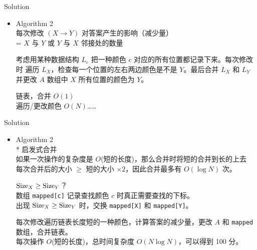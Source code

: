 \documentclass[UTF8]{beamer}
\begin{document}
\begin{frame}{Solution}

\begin{itemize}
    \item Algorithm 2 \\
        每次修改 $(X \rightarrow Y)$ 对答案产生的影响（减少量） \\
        = $X$ 与 $Y$ 或 $Y$ 与 $X$ 邻接处的数量

        \pause
        考虑用某种数据结构 $L_c$ 把一种颜色 $c$ 对应的所有位置都记录下来。每次修改时
        遍历 $L_X$，检查每一个位置的左右两边颜色是不是 $Y$。最后合并 $L_X$ 和 $L_Y$
        并更改 $A$ 数组中 $X$ 所有位置的颜色为 $Y$。

        \pause 链表，合并 $O(1)$ \\
        \pause 遍历/更改颜色 $O(N)$……
        
\end{itemize}

\end{frame}

\begin{frame}{Solution}

\begin{itemize}
    \item Algorithm 2 \\
        * 启发式合并 \\
        如果一次操作的复杂度是 $O$(短的长度)，那么合并时将短的合并到长的上去 \\
        每次合并后的大小 $\geq$ 短的大小 $\times 2$，因此合并最多有 $O(\log N)$ 次。

        \pause
        ${\rm Size}_X \ge {\rm Size}_Y$？ \\
        数组 \texttt{mapped[c]} 记录查找颜色 $c$ 时真正需要查找的下标。 \\
        出现 ${\rm Size}_X \ge {\rm Size}_Y$ 时，交换 \texttt{mapped[X]} 和 \texttt{mapped[Y]}。

        \pause
        每次修改遍历链表长度短的一种颜色，计算答案的减少量，更改 $A$ 和 \texttt{mapped} 数组，合并链表。 \\
        每次操作 $O$(短的长度)，总时间复杂度 $O(N \log N)$，可以得到 100 分。
\end{itemize}

\end{frame}
\end{document}
